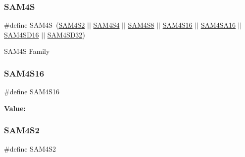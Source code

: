 \subsubsection{\texorpdfstring{SAM4S}{SAM4S}}
{\footnotesize\ttfamily \#define S\+A\+M4S~(\mbox{\hyperlink{group__sam__part__macros__group_ga797a42a5eb0d374075a5cbf6b6b5318b}{S\+A\+M4\+S2}} $\vert$$\vert$ \mbox{\hyperlink{group__sam__part__macros__group_ga9c0feae652dc37c207bd933f6db2d7f4}{S\+A\+M4\+S4}} $\vert$$\vert$ \mbox{\hyperlink{group__sam__part__macros__group_ga04e32c037894a537ffb6193413693cb0}{S\+A\+M4\+S8}} $\vert$$\vert$ \mbox{\hyperlink{group__sam__part__macros__group_ga1c3c5c80f2c2ca26604ff5d59cb3a0b2}{S\+A\+M4\+S16}} $\vert$$\vert$ \mbox{\hyperlink{group__sam__part__macros__group_ga51a0ff030b5d9e555653a4227538a888}{S\+A\+M4\+S\+A16}} $\vert$$\vert$ \mbox{\hyperlink{group__sam__part__macros__group_ga817106c645da5be09dd37af37d7fb805}{S\+A\+M4\+S\+D16}} $\vert$$\vert$ \mbox{\hyperlink{group__sam__part__macros__group_gaddfc17b115c4d5b5ff8b14eb2b8d4a2a}{S\+A\+M4\+S\+D32}})}

S\+A\+M4S Family \mbox{\label{group__sam__part__macros__group_ga1c3c5c80f2c2ca26604ff5d59cb3a0b2}} 
\subsubsection{\texorpdfstring{SAM4S16}{SAM4S16}}
{\footnotesize\ttfamily \#define S\+A\+M4\+S16}

{\bfseries Value\+:}
\begin{DoxyCode}{0}
\DoxyCodeLine{( \(\backslash\)}
\DoxyCodeLine{        )}

\end{DoxyCode}
\mbox{\label{group__sam__part__macros__group_ga797a42a5eb0d374075a5cbf6b6b5318b}} 
\subsubsection{\texorpdfstring{SAM4S2}{SAM4S2}}
{\footnotesize\ttfamily \#define S\+A\+M4\+S2}

